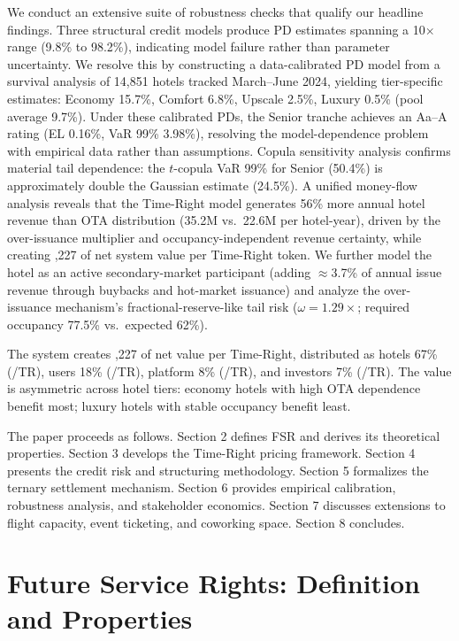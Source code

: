 \documentclass[12pt,a4paper]{article}
\begin{document}
We conduct an extensive suite of robustness checks that qualify our headline findings.
Three structural credit models produce PD estimates spanning a 10$\times$ range (9.8\% to 98.2\%), indicating model failure rather than parameter uncertainty.
We resolve this by constructing a data-calibrated PD model from a survival analysis of 14,851 hotels tracked March--June 2024, yielding tier-specific estimates: Economy 15.7\%, Comfort 6.8\%, Upscale 2.5\%, Luxury 0.5\% (pool average 9.7\%).
Under these calibrated PDs, the Senior tranche achieves an Aa--A rating (EL 0.16\%, VaR 99\% 3.98\%), resolving the model-dependence problem with empirical data rather than assumptions.
Copula sensitivity analysis confirms material tail dependence: the $t$-copula VaR 99\% for Senior (50.4\%) is approximately double the Gaussian estimate (24.5\%).
A unified money-flow analysis reveals that the Time-Right model generates 56\% more annual hotel revenue than OTA distribution (\yen 35.2M vs.\ \yen 22.6M per hotel-year), driven by the over-issuance multiplier and occupancy-independent revenue certainty, while creating ,227 of net system value per Time-Right token.
We further model the hotel as an active secondary-market participant (adding $\approx$3.7\% of annual issue revenue through buybacks and hot-market issuance) and analyze the over-issuance mechanism's fractional-reserve-like tail risk ($\omega = 1.29\times$; required occupancy 77.5\% vs.\ expected 62\%).

The system creates ,227 of net value per Time-Right, distributed as hotels 67\% (/TR), users 18\% (/TR), platform 8\% (/TR), and investors 7\% (/TR). The value is asymmetric across hotel tiers: economy hotels with high OTA dependence benefit most; luxury hotels with stable occupancy benefit least.

The paper proceeds as follows.
Section 2 defines FSR and derives its theoretical properties.
Section 3 develops the Time-Right pricing framework.
Section 4 presents the credit risk and structuring methodology.
Section 5 formalizes the ternary settlement mechanism.
Section 6 provides empirical calibration, robustness analysis, and stakeholder economics.
Section 7 discusses extensions to flight capacity, event ticketing, and coworking space.
Section 8 concludes.

\section{Future Service Rights: Definition and Properties}
\end{document}
